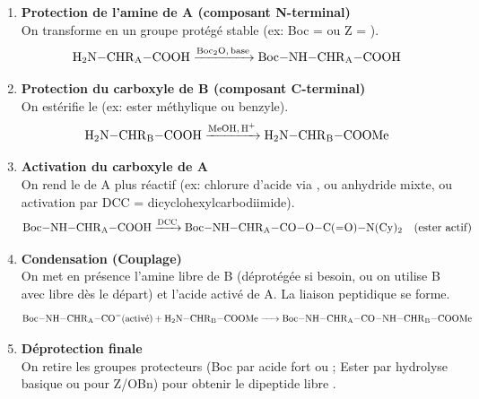 \documentclass[11pt]{article}
\newcommand{\cle}[1]{{\popxbold\color{popdark}#1}}
\begin{document}
\begin{methode}
\begin{enumerate}
  \item \textbf{Protection de l'amine de A (composant N-terminal)} \\
  On transforme  en un groupe protégé stable (ex: \cle{Boc} =  ou \cle{Z} = ).
  \[ \ce{H2N-CHR_A-COOH ->[Boc_2O, base] Boc-NH-CHR_A-COOH} \]
  \item \textbf{Protection du carboxyle de B (composant C-terminal)} \\
  On estérifie le  (ex: ester méthylique ou benzyle).
  \[ \ce{H2N-CHR_B-COOH ->[MeOH, H+] H2N-CHR_B-COOMe} \]
  \item \textbf{Activation du carboxyle de A} \\
  On rend le  de A plus réactif (ex: chlorure d'acide via , ou anhydride mixte, ou activation par \cle{DCC} = dicyclohexylcarbodiimide).
  \[ \ce{Boc-NH-CHR_A-COOH ->[DCC] Boc-NH-CHR_A-CO-O-C(=O)-N(Cy)2} \quad \text{(ester actif)} \]
  \item \textbf{Condensation (Couplage)} \\
  On met en présence l'amine libre de B (déprotégée si besoin, ou on utilise B avec  libre dès le départ) et l'acide activé de A. La liaison peptidique se forme.
  \[ \ce{Boc-NH-CHR_A-CO-} \text{(activé)} \ce{+ H2N-CHR_B-COOMe -> Boc-NH-CHR_A-CO-NH-CHR_B-COOMe} \]
  \item \textbf{Déprotection finale} \\
  On retire les groupes protecteurs (Boc par acide fort  ou  ; Ester par hydrolyse basique  ou  pour Z/OBn) pour obtenir le dipeptide libre .
\end{enumerate}
\end{methode}
\end{document}

